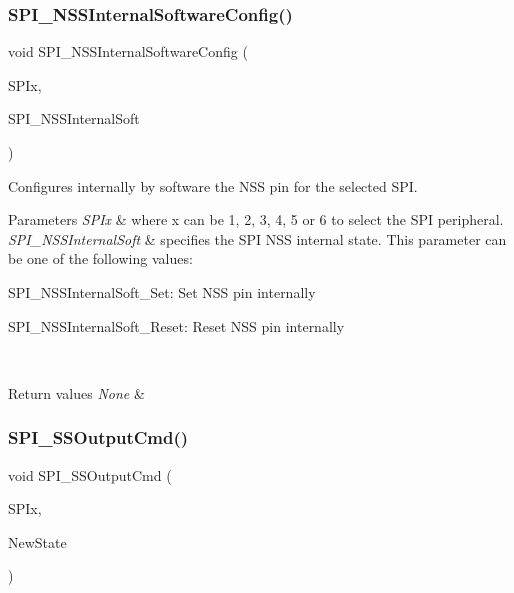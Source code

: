 \subsubsection{\texorpdfstring{S\+P\+I\+\_\+\+N\+S\+S\+Internal\+Software\+Config()}{SPI\_NSSInternalSoftwareConfig()}}
{\footnotesize\ttfamily void S\+P\+I\+\_\+\+N\+S\+S\+Internal\+Software\+Config (\begin{DoxyParamCaption}\item[{S\+P\+I\+\_\+\+Type\+Def $\ast$}]{S\+P\+Ix,  }\item[{uint16\+\_\+t}]{S\+P\+I\+\_\+\+N\+S\+S\+Internal\+Soft }\end{DoxyParamCaption})}



Configures internally by software the N\+SS pin for the selected S\+PI. 


\begin{DoxyParams}{Parameters}
{\em S\+P\+Ix} & where x can be 1, 2, 3, 4, 5 or 6 to select the S\+PI peripheral. \\
\hline
{\em S\+P\+I\+\_\+\+N\+S\+S\+Internal\+Soft} & specifies the S\+PI N\+SS internal state. This parameter can be one of the following values\+: \begin{DoxyItemize}
\item S\+P\+I\+\_\+\+N\+S\+S\+Internal\+Soft\+\_\+\+Set\+: Set N\+SS pin internally \item S\+P\+I\+\_\+\+N\+S\+S\+Internal\+Soft\+\_\+\+Reset\+: Reset N\+SS pin internally \end{DoxyItemize}
\\
\hline
\end{DoxyParams}

\begin{DoxyRetVals}{Return values}
{\em None} & \\
\hline
\end{DoxyRetVals}
\mbox{\label{group___s_p_i___group1_ga4ec54abdedf6cd17403d853a926d91c1}} 
\subsubsection{\texorpdfstring{S\+P\+I\+\_\+\+S\+S\+Output\+Cmd()}{SPI\_SSOutputCmd()}}
{\footnotesize\ttfamily void S\+P\+I\+\_\+\+S\+S\+Output\+Cmd (\begin{DoxyParamCaption}\item[{S\+P\+I\+\_\+\+Type\+Def $\ast$}]{S\+P\+Ix,  }\item[{Functional\+State}]{New\+State }\end{DoxyParamCaption})}



